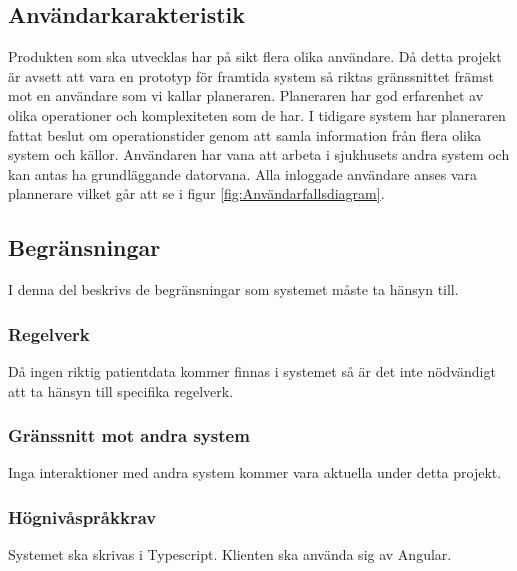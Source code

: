 \documentclass[twoside]{article}
\begin{document}
\subsection{Användarkarakteristik}
\label{subsec:Andvandarkarateristik}
Produkten som ska utvecklas har på sikt flera olika användare. Då detta
projekt är avsett att vara en prototyp för framtida system så riktas
gränssnittet
främst mot en användare som vi kallar planeraren. Planeraren har god
erfarenhet av olika operationer och komplexiteten som de har. I tidigare system
har planeraren fattat beslut om operationstider genom att samla information
från flera olika system och källor. Användaren har vana att arbeta i
sjukhusets
andra system och kan antas ha grundläggande datorvana. Alla inloggade användare anses vara plannerare vilket går att se i figur \ref{fig:Användarfallsdiagram}.

\subsection{Begränsningar}
\label{subsec:Begransningar}
I denna del beskrivs de begränsningar som systemet måste ta hänsyn till.

\subsubsection{Regelverk}
\label{subsec:Regelverk}
Då ingen riktig patientdata kommer finnas i systemet så är det inte nödvändigt
att ta hänsyn till specifika regelverk.

\subsubsection{Gränssnitt mot andra system}
\label{subsec:Granssnitt till andra system}
Inga interaktioner med andra system kommer vara aktuella under detta projekt.

\subsubsection{Högnivåspråkkrav}
\label{subsec:Hognivasprakkrav}
Systemet ska skrivas i Typescript. Klienten ska använda sig av Angular.


\end{document}
